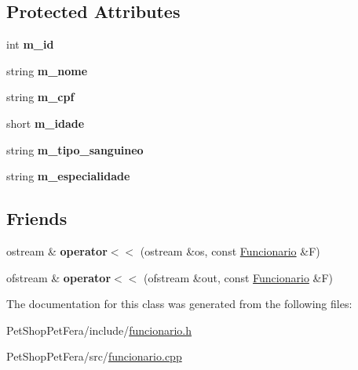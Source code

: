 \subsection*{Protected Attributes}
\begin{DoxyCompactItemize}
\item 
\mbox{\label{class_funcionario_a123c4af00e4e6eea5d4d9366a8bfefed}} 
int {\bfseries m\+\_\+id}
\item 
\mbox{\label{class_funcionario_a09663cf1395c066ef8cd538ead0f1a10}} 
string {\bfseries m\+\_\+nome}
\item 
\mbox{\label{class_funcionario_af367fc8ad2efde9527d1ed0455560690}} 
string {\bfseries m\+\_\+cpf}
\item 
\mbox{\label{class_funcionario_a2bc5a68aebcf1a792812430ce5c8bdca}} 
short {\bfseries m\+\_\+idade}
\item 
\mbox{\label{class_funcionario_a89037092e620b92e1e8e305de50cb2d9}} 
string {\bfseries m\+\_\+tipo\+\_\+sanguineo}
\item 
\mbox{\label{class_funcionario_a501682f1767cc891f9908ebc42e9e186}} 
string {\bfseries m\+\_\+especialidade}
\end{DoxyCompactItemize}
\subsection*{Friends}
\begin{DoxyCompactItemize}
\item 
\mbox{\label{class_funcionario_a8991ad96df8cf16555a715d0ce6aa1c1}} 
ostream \& {\bfseries operator$<$$<$} (ostream \&os, const \mbox{\hyperlink{class_funcionario}{Funcionario}} \&F)
\item 
\mbox{\label{class_funcionario_ac0721615b2abd6965e8145564344f427}} 
ofstream \& {\bfseries operator$<$$<$} (ofstream \&out, const \mbox{\hyperlink{class_funcionario}{Funcionario}} \&F)
\end{DoxyCompactItemize}


The documentation for this class was generated from the following files\+:\begin{DoxyCompactItemize}
\item 
Pet\+Shop\+Pet\+Fera/include/\mbox{\hyperlink{funcionario_8h}{funcionario.\+h}}\item 
Pet\+Shop\+Pet\+Fera/src/\mbox{\hyperlink{funcionario_8cpp}{funcionario.\+cpp}}\end{DoxyCompactItemize}
